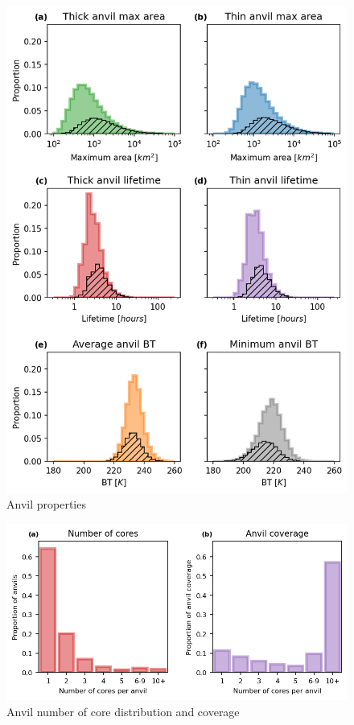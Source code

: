 \begin{figure}[tp]
    \centering
    \includegraphics[width=\textwidth]{figures/ch2_18.png}
    \caption{Anvil properties}
    \label{fig:anvil_properties}
\end{figure}

\begin{figure}[tp]
    \centering
    \includegraphics[width=\textwidth]{figures/ch2_19.png}
    \caption{Anvil number of core distribution and coverage}
    \label{fig:anvil_cores_and_coverage}
\end{figure}

